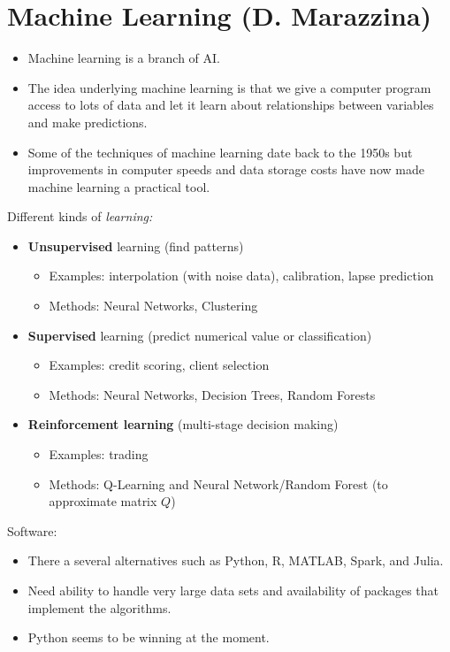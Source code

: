 
\chapter{Machine Learning (D. Marazzina)}

\begin{itemize}
    \item Machine learning is a branch of AI.
    \item The idea underlying machine learning is that we give a computer program access to lots of data and let it learn about relationships between variables and make predictions.
    \item Some of the techniques of machine learning date back to the 1950s but improvements in computer speeds and data storage costs have now made machine learning a practical tool.
\end{itemize}

Different kinds of \textit{learning:}
\begin{itemize}
    \item \textbf{Unsupervised} learning (find patterns)
    \begin{itemize}
        \item Examples: interpolation (with noise data), calibration, lapse prediction 
        \item Methods: Neural Networks, Clustering
    \end{itemize}
    \item \textbf{Supervised} learning (predict numerical value or classification)
    \begin{itemize}
        \item Examples: credit scoring, client selection
        \item Methods: Neural Networks, Decision Trees, Random Forests
    \end{itemize}
    \item \textbf{Reinforcement learning} (multi-stage decision making)
    \begin{itemize}
        \item Examples: trading
        \item Methods: Q-Learning and Neural Network/Random Forest (to approximate matrix $Q$)
    \end{itemize}
\end{itemize}

Software:
\begin{itemize}
    \item There a several alternatives such as Python, R, MATLAB, Spark, and Julia.
    \item Need ability to handle very large data sets and availability of packages that implement the algorithms.
    \item Python seems to be winning at the moment.
\end{itemize}


